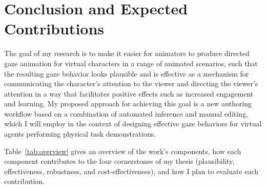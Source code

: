 


\pagestyle{deposit}

\chapter{Conclusion and Expected Contributions}

The goal of my research is to make it easier for animators to produce directed gaze animation for virtual characters in a range of animated scenarios, such that the resulting gaze behavior looks plausible and is effective as a mechanism for communicating the character's attention to the viewer and directing the viewer's attention in a way that facilitates positive effects such as increased engagement and learning. My proposed approach for achieving this goal is a new authoring workflow based on a combination of automated inference and manual editing, which I will employ in the context of designing effective gaze behaviors for virtual agents performing physical task demonstrations.

Table~\ref{tab:overview} gives an overview of the work's components, how each component contributes to the four cornerstones of my thesis (plausibility, effectiveness, robustness, and cost-effectiveness), and how I plan to evaluate each contribution.

